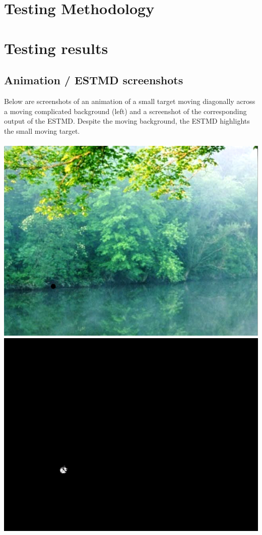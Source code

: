 \documentclass[a4paper,11pt]{article}
\begin{document}
\section{Testing Methodology}

\section{Testing results}

{}


\begin{appendices}
\section{Animation / ESTMD screenshots}
Below are screenshots of an animation of a small target moving diagonally across a moving complicated background (left) and a screenshot of the corresponding output of the ESTMD. Despite the moving background, the ESTMD highlights the small moving target. \\ \\
\includegraphics[scale = 0.4]{input}
\includegraphics[scale = 0.5]{processed}

\end{appendices}
\end{document}
